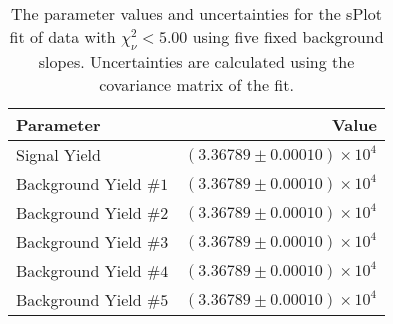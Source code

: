
\begin{table}[ht]
    \begin{center}
        \begin{tabular}{lr}\toprule
            Parameter & Value \\\midrule
            Signal Yield & $(3.36789 \pm 0.00010) \times 10^{4}$ \\
            Background Yield $\#1$ & $(3.36789 \pm 0.00010) \times 10^{4}$ \\
            Background Yield $\#2$ & $(3.36789 \pm 0.00010) \times 10^{4}$ \\
            Background Yield $\#3$ & $(3.36789 \pm 0.00010) \times 10^{4}$ \\
            Background Yield $\#4$ & $(3.36789 \pm 0.00010) \times 10^{4}$ \\
            Background Yield $\#5$ & $(3.36789 \pm 0.00010) \times 10^{4}$ \\\bottomrule
        \end{tabular}
        \caption{The parameter values and uncertainties for the sPlot fit of data with $\chi^2_\nu < 5.00$ using five fixed background slopes. Uncertainties are calculated using the covariance matrix of the fit.}\label{tab:splot-fit-results-chisqdof-5.00-fixed-5}
    \end{center}
\end{table}
